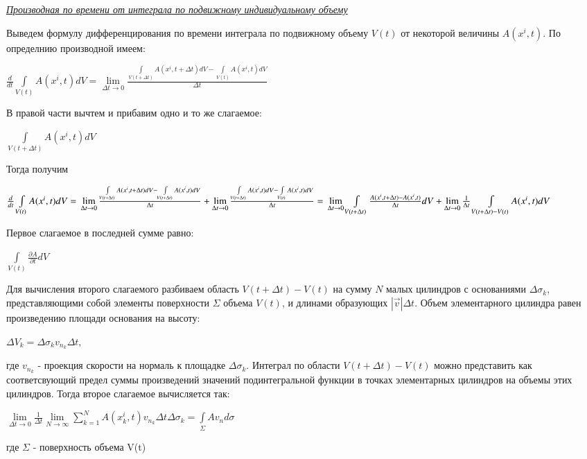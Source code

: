 \begin{center}
    \textit{\underline{Производная по времени от интеграла по подвижному индивидуальному объему}}
\end{center}
Выведем формулу дифференцирования по времени интеграла по подвижному объему $V(t)$ от некоторой величины $A(x^i, t)$. По определнию производной имеем:
\begin{center}$
\frac{d}{dt} \int\limits_{V(t)} A(x^i,t) dV =
\lim\limits_{\Delta t \to 0} \frac{\int\limits_{V(t + \Delta t)} A(x^i,t + \Delta t)dV - \int\limits_{V(t)}A(x^i,t)dV}{\Delta t}
$\end{center}
В правой части вычтем и прибавим одно и то же слагаемое:
\begin{center}$
\int\limits_{V(t + \Delta t)} A(x^i, t)dV
$\end{center}
Тогда получим
\begin{center}$
\frac{d}{dt} \int\limits_{V(t)} A(x^i,t) dV
=\newline
\lim\limits_{\Delta t \to 0} \frac{\int\limits_{V(t + \Delta t)} A(x^i,t + \Delta t)dV - \int\limits_{V(t + \Delta t)}A(x^i,t)dV}{\Delta t}
+
\lim\limits_{\Delta t \to 0} \frac{\int\limits_{V(t + \Delta t)} A(x^i,t)dV - \int\limits_{V(t)}A(x^i,t)dV}{\Delta t}
=\newline
\lim\limits_{\Delta t \to 0}\int\limits_{V(t + \Delta t)} \frac{A(x^i, t + \Delta t) - A(x^i, t)}{\Delta t}dV
+
\lim\limits_{\Delta t \to 0}\frac{1}{\Delta t}\int\limits_{V(t + \Delta t) - V(t)}A(x^i, t)dV
$\end{center}
Первое слагаемое в последней сумме равно:
\begin{center}$
\int\limits_{V(t)}\frac{\partial A}{\partial t}dV
$\end{center}
Для вычисления второго слагаемого разбиваем область $V(t + \Delta t) - V(t)$ на сумму $N$ малых цилиндров с основаниями $\Delta \sigma_k$, представляющими собой элементы поверхности $\Sigma$ объема $V(t)$, и длинами образующих $|\Vec{v}|\Delta
t$. Объем элементарного цилиндра равен произведению площади основания на высоту:
\begin{center}$
\Delta V_k = \Delta \sigma_k v_{n_k} \Delta t,
$\end{center}
где $v_{n_k}$ - проекция скорости на нормаль к площадке $\Delta \sigma_k$. Интеграл по области $V(t + \Delta t) - V(t)$ можно представить как соответсвующий предел суммы произведений значений подинтегральной функции в точках элементарных цилиндров на объемы этих цилиндров. Тогда второе слагаемое вычисляется так:
\begin{center}$
\lim\limits_{\Delta t \to 0} \frac{1}{\Delta t}\lim\limits_{N \to \infty}\sum_{k=1}^{N}A(x_k^i,t)v_{n_k}\Delta t \Delta \sigma_k
=
\int\limits_{\Sigma}Av_n d\sigma
$\end{center}
где $\Sigma$ - поверхность объема V(t)

